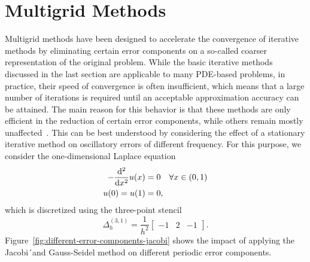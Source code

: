 \section{Multigrid Methods}
Multigrid methods have been designed to accelerate the convergence of iterative methods by eliminating certain error components on a so-called coarser representation of the original problem.
While the basic iterative methods discussed in the last section are applicable to many PDE-based problems, in practice, their speed of convergence is often insufficient, which means that a large number of iterations is required until an acceptable approximation accuracy can be attained. 
The main reason for this behavior is that these methods are only efficient in the reduction of certain error components, while others remain mostly unaffected~\cite{briggs2000multigrid}.
This can be best understood by considering the effect of a stationary iterative method on oscillatory errors of different frequency.
For this purpose, we consider the one-dimensional Laplace equation
\begin{equation}
		\begin{split}
			- \dv[2]{x} u(x) & = 0 \quad \forall x \in (0, 1) \\
			u(0) = u(1) & = 0,
		\end{split}
		\label{eq:1D-laplace-model}
\end{equation}
which is discretized using the three-point stencil
\begin{equation}
	\Delta_h^{(3, 1)} = \frac{1}{h^2}\begin{bmatrix}
		-1 & 2 & -1
	\end{bmatrix}.
\end{equation} 
Figure~\ref{fig:different-error-components-jacobi} shows the impact of applying the Jacobi´and Gauss-Seidel method on different periodic error components.
